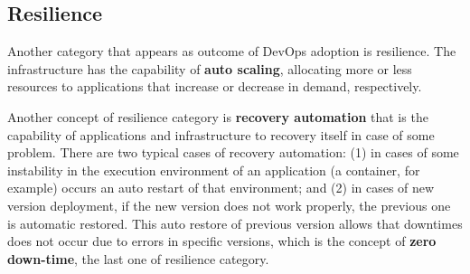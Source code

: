 \subsection{Resilience}
Another category that appears as outcome of DevOps adoption is resilience. The
infrastructure has the capability of \textbf{auto scaling}, allocating more or
less resources to applications that increase or decrease in demand,
respectively.

Another concept of resilience category is \textbf{recovery automation} that is
the capability of applications and infrastructure to recovery itself in case of
some problem. There are two typical cases of recovery automation: (1) in cases
of some instability in the execution environment of an application (a
container, for example) occurs an auto restart of that environment; and (2) in
cases of new version deployment, if the new version does not work properly, the
previous one is automatic restored. This auto restore of previous version
allows that downtimes does not occur due to errors in specific versions, which
is the concept of \textbf{zero down-time}, the last one of resilience category.
